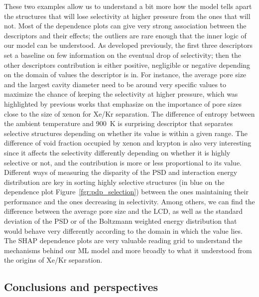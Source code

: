 \documentclass[main]{subfiles}
\begin{document}
These two examples allow us to understand a bit more how the model tells apart the structures that will lose selectivity at higher pressure from the ones that will not. Most of the dependence plots can give very strong association between the descriptors and their effects; the outliers are rare enough that the inner logic of our model can be understood. As developed previously, the first three descriptors set a baseline on few information on the eventual drop of selectivity; then the other descriptors contribution is either positive, negligible or negative depending on the domain of values the descriptor is in. For instance, the average pore size and the largest cavity diameter need to be around very specific values to maximize the chance of keeping the selectivity at higher pressure, which was highlighted by previous works that emphasize on the importance of pore sizes close to the size of xenon for Xe/Kr separation. The difference of entropy between the ambient temperature and \SI{900}{\kelvin} is surprising descriptor that separates selective structures depending on whether its value is within a given range. The difference of void fraction occupied by xenon and krypton is also very interesting since it affects the selectivity differently depending on whether it is highly selective or not, and the contribution is more or less proportional to its value. Different ways of measuring the disparity of the PSD and interaction energy distribution are key in sorting highly selective structures (in blue on the dependence plot Figure~\ref{fgr:pdp_selection}) between the ones maintaining their performance and the ones decreasing in selectivity. Among others, we can find the difference between the average pore size and the LCD, as well as the standard deviation of the PSD or of the Boltzmann weighted energy distribution that would behave very differently according to the domain in which the value lies. The SHAP dependence plots are very valuable reading grid to understand the mechanisms behind our ML model and more broadly to what it understood from the origins of Xe/Kr separation.

\subsection{Conclusions and perspectives}
\end{document}
